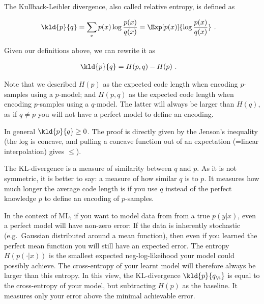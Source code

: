 The Kullback-Leibler divergence, also called relative entropy, is defined as

\begin{align}
\kld{p}{q}
&= \sum_x p(x) \log\frac{p(x)}{q(x)}
 = \Exp[p(x)]{\log\frac{p(x)}{q(x)}} ~.
\end{align}

Given our definitions above, we can rewrite it as

\begin{align}
\kld{p}{q}
&= H(p, q) - H(p) ~.
\end{align}

Note that we described $H(p)$ as the expected code length when encoding $p$-samples using a $p$-model; and $H(p, q)$ as the expected code length when encoding $p$-samples using a $q$-model. The latter will always be larger than $H(q)$, as if $q\not= p$ you will not have a perfect model to define an encoding.

In general $\kld{p}{q} \ge 0$. The proof is directly given by the Jenson's inequality (the log is concave, and pulling a concave function out of an expectation (=linear interpolation) gives $\le$).
 
The KL-divergence is a measure of similarity between $q$ and $p$. As it is not symmetric, it is better to say: a measure of how similar $q$ is to $p$. It measures how much longer the average code length is if you use $q$ instead of the perfect knowledge $p$ to define an encoding of $p$-samples.

In the context of ML, if you want to model data from from a true
$p(y|x)$, even a perfect model will have non-zero error: If the data
is inherently stochastic (e.g.\ Gaussian distributed around a mean
function), then even if you learned the perfect mean function you will
still have an expected error. The entropy $H(p(\cdot|x))$ is the
smallest expected neg-log-likeihood your model could possibly
achieve. The cross-entropy of your learnt model will therefore always
be larger than this entropy. In this view, the KL-divergence $\kld{p}{q_\t}$ is equal to the cross-entropy of your model, but subtracting $H(p)$ as the baseline. It measures only your error above the minimal achievable error.


